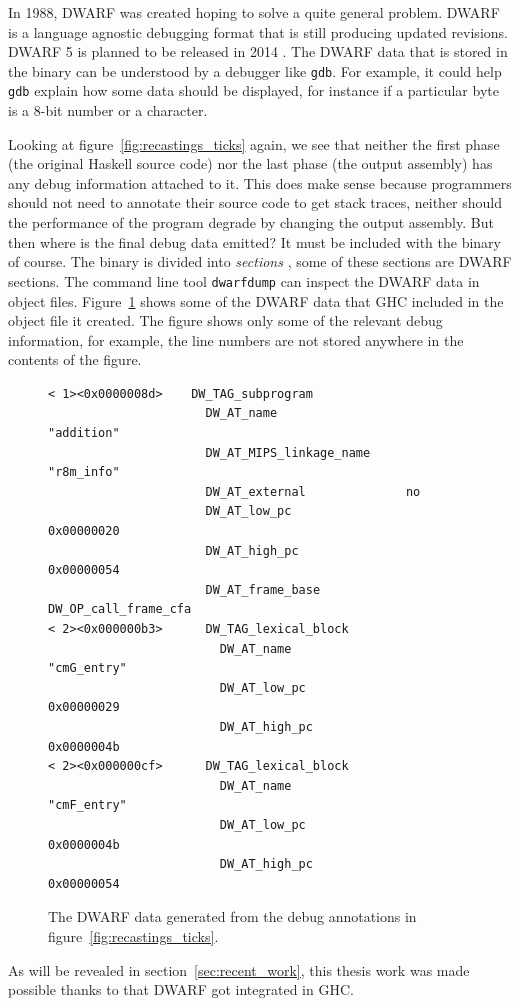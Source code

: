 In 1988, DWARF was created hoping to solve a quite general problem. DWARF is
a language agnostic debugging format that is still producing updated revisions.
DWARF 5 is planned to be released in 2014 \cite{eager2012introduction}. The DWARF data that is
stored in the binary can be understood by a debugger like \texttt{gdb}. For example,
it could help \texttt{gdb} explain how some data should be displayed, for instance if a
particular byte is a 8-bit number or a character.

Looking at figure~\ref{fig:recastings_ticks} again, we see that neither
the first phase (the original Haskell source code) nor the last
phase (the output assembly) has any debug information attached to
it. This does make sense because programmers should not need to
annotate their source code to get stack traces, neither should the
performance of the program degrade by changing the output assembly.
But then where is the final debug data emitted? It must be included
with the binary of course. The binary is divided into \emph{sections}
\cite{oracle_object_file_format}, some of these sections are DWARF
sections. The command line tool \texttt{dwarfdump} can inspect the
DWARF data in object files. Figure~\ref{fig:dwarfdump} shows some of the
DWARF data that GHC included in the object file it created. The figure
shows only some of the relevant debug information, for example, the line
numbers are not stored anywhere in the contents of the figure.

\begin{figure}
\begin{mdframed}
  \begin{verbatim}
< 1><0x0000008d>    DW_TAG_subprogram
                      DW_AT_name                  "addition"
                      DW_AT_MIPS_linkage_name     "r8m_info"
                      DW_AT_external              no
                      DW_AT_low_pc                0x00000020
                      DW_AT_high_pc               0x00000054
                      DW_AT_frame_base            DW_OP_call_frame_cfa
< 2><0x000000b3>      DW_TAG_lexical_block
                        DW_AT_name                  "cmG_entry"
                        DW_AT_low_pc                0x00000029
                        DW_AT_high_pc               0x0000004b
< 2><0x000000cf>      DW_TAG_lexical_block
                        DW_AT_name                  "cmF_entry"
                        DW_AT_low_pc                0x0000004b
                        DW_AT_high_pc               0x00000054
  \end{verbatim}
  \caption{The DWARF data generated from the debug annotations in figure~\ref{fig:recastings_ticks}.}
  \label{fig:dwarfdump}
\end{mdframed}
\end{figure}

As will be revealed in
section~\ref{sec:recent_work}, this thesis work was made possible thanks
to that DWARF got integrated in GHC.
